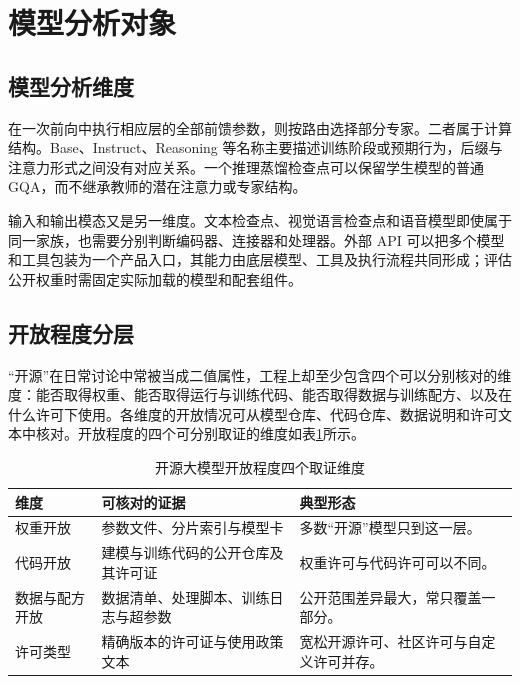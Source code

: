 \documentclass[../textbook.tex]{subfiles}
\begin{document}
\section{模型分析对象}

\subsection{模型分析维度}
在一次前向中执行相应层的全部前馈参数，则按路由选择部分专家。二者属于计算结构。Base、Instruct、Reasoning 等名称主要描述训练阶段或预期行为，后缀与注意力形式之间没有对应关系。一个推理蒸馏检查点可以保留学生模型的普通 GQA，而不继承教师的潜在注意力或专家结构。

输入和输出模态又是另一维度。文本检查点、视觉语言检查点和语音模型即使属于同一家族，也需要分别判断编码器、连接器和处理器。外部 API 可以把多个模型和工具包装为一个产品入口，其能力由底层模型、工具及执行流程共同形成；评估公开权重时需固定实际加载的模型和配套组件。

\subsection{开放程度分层}
\label{sec:open-openness}
“开源”在日常讨论中常被当成二值属性，工程上却至少包含四个可以分别核对的维度：能否取得权重、能否取得运行与训练代码、能否取得数据与训练配方、以及在什么许可下使用。各维度的开放情况可从模型仓库、代码仓库、数据说明和许可文本中核对。开放程度的四个可分别取证的维度如表\ref{tab:open-openness-levels}所示。

\begin{table}[htbp]
\centering
\caption{开源大模型开放程度四个取证维度}\label{tab:open-openness-levels}
\begin{tabularx}{\linewidth}{p{24mm}XX}
\toprule 维度 & 可核对的证据 & 典型形态\\\midrule
权重开放 & 参数文件、分片索引与模型卡 & 多数“开源”模型只到这一层。\\
代码开放 & 建模与训练代码的公开仓库及其许可证 & 权重许可与代码许可可以不同。\\
数据与配方开放 & 数据清单、处理脚本、训练日志与超参数 & 公开范围差异最大，常只覆盖一部分。\\
许可类型 & 精确版本的许可证与使用政策文本 & 宽松开源许可、社区许可与自定义许可并存。\\
\bottomrule
\end{tabularx}
\end{table}
\end{document}
